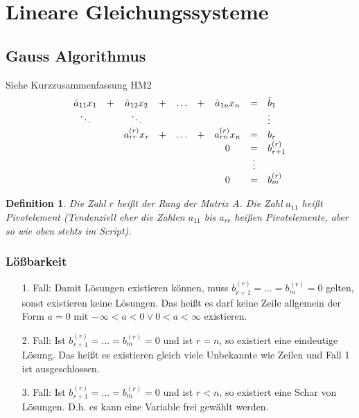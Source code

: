 \documentclass[12pt,a4paper]{report}%
\newtheorem{definition}[satz]{Definition}
\numberwithin{equation}{section}
\numberwithin{equation}{subsection}
\begin{document}
\section{Lineare Gleichungssysteme}
  \subsection{Gauss Algorithmus}
  Siehe Kurzzusammenfassung HM2
  \begin{align}
	     \begin{array}{c c c c c c c c l}
	       \tilde{a}_{11} x_1 & + & \tilde{a}_{12} x_2 & + & \dots & + & \tilde{a}_{1n} x_n & = &  \tilde{b}_1 \\
	       \ddots &\;& \ddots &\;&\;&\;&\;&\;&\vdots\\
	       \; & \; & a^{(r)}_{rr}x_r &+& \dots &+& a^{(r)}_{rn}x_n &=& b_r\\
	       &\;&\;&\;&\;&\;& 0 & = & b^{(r)}_{r+1}\\
	       &\;&\;&\;&\;&\;& \; & \vdots & \;\\
	       &\;&\;&\;&\;&\;& 0 & = & b^{(r)}_{m}
	     \end{array}
	\end{align}
	\begin{definition}
	  Die Zahl $r$ heißt der Rang der Matrix A. Die Zahl $a_{11}$ heißt Pivotelement (Tendenziell eher die Zahlen $a_{11}$ bis $a_{rr}$ heißen Pivotelemente, aber so wie oben stehts im Script). 
	\end{definition}
	
	\subsubsection{Lößbarkeit}
	\begin{itemize}
	  \item[1. Fall: ]
	  Damit Lösungen existieren können, muss $b^{(r)}_{r+1} = ... = b^{(r)}_{m} = 0$ gelten, sonst existieren keine Lösungen. Das heißt es darf keine Zeile allgemein der Form $a = 0$ mit $-\infty < a < 0 \lor 0 < a < \infty$ existieren.
	  \item[2. Fall: ]
	    Ist $b^{(r)}_{r+1} = ... = b^{(r)}_{m} = 0$ und ist $r = n$, so existiert eine eindeutige Lösung. Das heißt es existieren gleich viele Unbekannte wie Zeilen und Fall 1 ist ausgeschlossen.
    \item[3. Fall: ]
    Ist $b^{(r)}_{r+1} = ... = b^{(r)}_{m} = 0$ und ist $r < n$, so existiert eine Schar von Lösungen. D.h. es kann eine Variable frei gewählt werden.
  \end{itemize}
	\newpage
	
\end{document}
